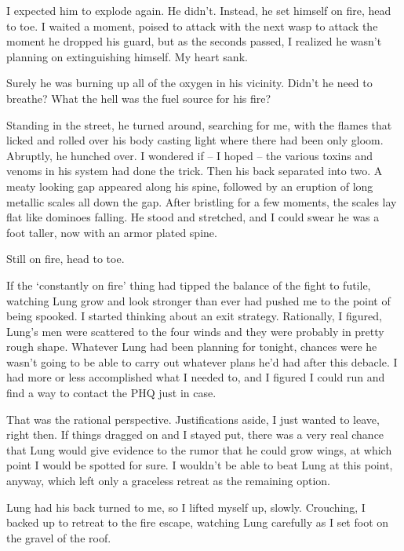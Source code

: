 I expected him to explode again.  He didn't.  Instead, he set himself on fire, head to toe.  I waited a moment, poised to attack with the next wasp to attack the moment he dropped his guard, but as the seconds passed, I realized he wasn't planning on extinguishing himself.  My heart sank.



Surely he was burning up all of the oxygen in his vicinity.  Didn't he need to breathe?  What the hell was the fuel source for his fire?



Standing in the street, he turned around, searching for me, with the flames that licked and rolled over his body casting light where there had been only gloom.  Abruptly, he hunched over.  I wondered if – I hoped – the various toxins and venoms in his system had done the trick.  Then his back separated into two.  A meaty looking gap appeared along his spine, followed by an eruption of long metallic scales all down the gap.  After bristling for a few moments, the scales lay flat like dominoes falling.  He stood and stretched, and I could swear he was a foot taller, now with an armor plated spine.



Still on fire, head to toe.



If the `constantly on fire' thing had tipped the balance of the fight to futile, watching Lung grow and look stronger than ever had pushed me to the point of being spooked.  I started thinking about an exit strategy.  Rationally, I figured, Lung's men were scattered to the four winds and they were probably in pretty rough shape.  Whatever Lung had been planning for tonight, chances were he wasn't going to be able to carry out whatever plans he'd had after this debacle.  I had more or less accomplished what I needed to, and I figured I could run and find a way to contact the PHQ just in case.



That was the rational perspective.  Justifications aside, I just wanted to leave, right then.  If things dragged on and I stayed put, there was a very real chance that Lung would give evidence to the rumor that he could grow wings, at which point I would be spotted for sure.  I wouldn't be able to beat Lung at this point, anyway, which left only a graceless retreat as the remaining option.



Lung had his back turned to me, so I lifted myself up, slowly.  Crouching, I backed up to retreat to the fire escape, watching Lung carefully as I set foot on the gravel of the roof.



